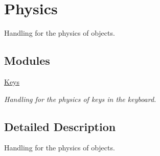 \hypertarget{group___doc_physics}{}\section{Physics}
\label{group___doc_physics}


Handling for the physics of objects.  


\subsection*{Modules}
\begin{DoxyCompactItemize}
\item 
\hyperlink{group___doc_keys}{Keys}
\begin{DoxyCompactList}\small\item\em Handling for the physics of keys in the keyboard. \end{DoxyCompactList}\end{DoxyCompactItemize}


\subsection{Detailed Description}
Handling for the physics of objects. 

